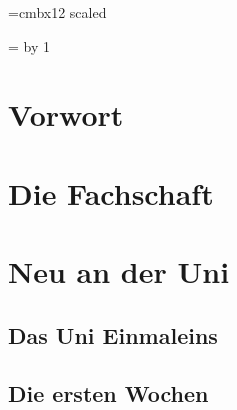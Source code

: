 \documentclass[12pt, a4paper]{article}
\newif\ifinfo
\begin{document}
\emergencystretch=2cm

\font\vlarge=cmbx12 scaled 
\newdimen\oldbaselineskp
\newcount\auflage
\newcount\jahr
\newcount\jahrpluseins
\setcounter{secnumdepth}{0}

\newcommand*{\email}[1]{\url{#1}}
\newcommand*{\filename}[1]{\url{#1}}



\jahrpluseins=\jahr
\advance \jahrpluseins by 1

\ifinfo
	
\else
	
\fi

\ifinfo
	
\else
	
\fi


\section{Vorwort}
\ifinfo
	
\else
	
\fi


\tableofcontents
\newpage

\onecolumn
\section{Die Fachschaft}
\ifinfo
	
\else
	
\fi

\section{Neu an der Uni}
\subsection{Das Uni Einmaleins}
\ifinfo
	

	\subsection{Die ersten Wochen} 
	
\end{document}
